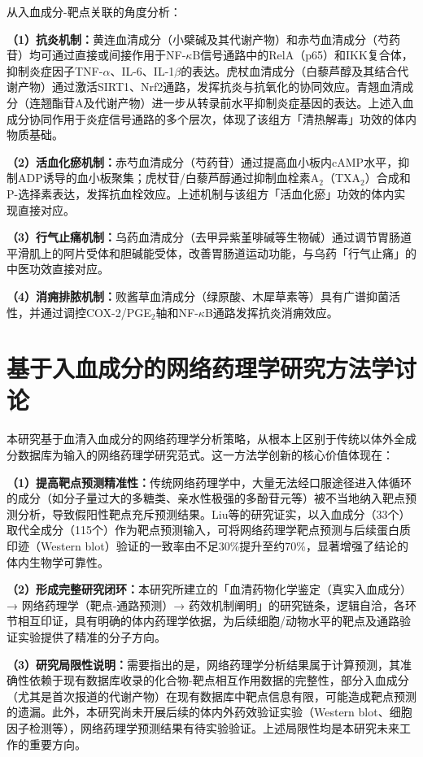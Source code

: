 \documentclass[12pt,a4paper,UTF8,openany]{ctexbook}
\begin{document}
从入血成分-靶点关联的角度分析：

\textbf{（1）抗炎机制：}黄连血清成分（小檗碱及其代谢产物）和赤芍血清成分（芍药苷）均可通过直接或间接作用于NF-$\kappa$B信号通路中的RelA（p65）和IKK复合体，抑制炎症因子TNF-$\alpha$、IL-6、IL-1$\beta$的表达\cite{FengX2021,QiuLab2019}。虎杖血清成分（白藜芦醇及其结合代谢产物）通过激活SIRT1、Nrf2通路，发挥抗炎与抗氧化的协同效应\cite{ZhangY2023}。青翘血清成分（连翘酯苷A及代谢产物）进一步从转录前水平抑制炎症基因的表达\cite{Review2021FA}。上述入血成分协同作用于炎症信号通路的多个层次，体现了该组方「清热解毒」功效的体内物质基础。

\textbf{（2）活血化瘀机制：}赤芍血清成分（芍药苷）通过提高血小板内cAMP水平，抑制ADP诱导的血小板聚集；虎杖苷/白藜芦醇通过抑制血栓素A$_2$（TXA$_2$）合成和P-选择素表达，发挥抗血栓效应\cite{Yang2024}。上述机制与该组方「活血化瘀」功效的体内实现直接对应。

\textbf{（3）行气止痛机制：}乌药血清成分（去甲异紫堇啡碱等生物碱）通过调节胃肠道平滑肌上的阿片受体和胆碱能受体，改善胃肠道运动功能，与乌药「行气止痛」的中医功效直接对应\cite{Tong2015}。

\textbf{（4）消痈排脓机制：}败酱草血清成分（绿原酸、木犀草素等）具有广谱抑菌活性，并通过调控COX-2/PGE$_2$轴和NF-$\kappa$B通路发挥抗炎消痈效应\cite{Gong2021}。

\section{基于入血成分的网络药理学研究方法学讨论}

本研究基于血清入血成分的网络药理学分析策略，从根本上区别于传统以体外全成分数据库为输入的网络药理学研究范式。这一方法学创新的核心价值体现在：

\textbf{（1）提高靶点预测精准性：}传统网络药理学中，大量无法经口服途径进入体循环的成分（如分子量过大的多糖类、亲水性极强的多酚苷元等）被不当地纳入靶点预测分析，导致假阳性靶点充斥预测结果。Liu等\cite{LiuY2024}的研究证实，以入血成分（33个）取代全成分（115个）作为靶点预测输入，可将网络药理学靶点预测与后续蛋白质印迹（Western blot）验证的一致率由不足30\%提升至约70\%，显著增强了结论的体内生物学可靠性。

\textbf{（2）形成完整研究闭环：}本研究所建立的「血清药物化学鉴定（真实入血成分）→ 网络药理学（靶点-通路预测）→ 药效机制阐明」的研究链条，逻辑自洽，各环节相互印证，具有明确的体内药理学依据，为后续细胞/动物水平的靶点及通路验证实验提供了精准的分子方向\cite{Feng2021NP,LiuY2023}。

\textbf{（3）研究局限性说明：}需要指出的是，网络药理学分析结果属于计算预测，其准确性依赖于现有数据库收录的化合物-靶点相互作用数据的完整性，部分入血成分（尤其是首次报道的代谢产物）在现有数据库中靶点信息有限，可能造成靶点预测的遗漏。此外，本研究尚未开展后续的体内外药效验证实验（Western blot、细胞因子检测等），网络药理学预测结果有待实验验证。上述局限性均是本研究未来工作的重要方向。
\end{document}
